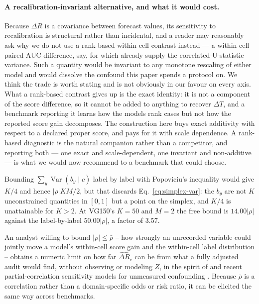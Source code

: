 \paragraph{A recalibration-invariant alternative, and what it would cost.}
Because $\Delta R$ is a covariance between forecast values, its sensitivity to
recalibration is structural rather than incidental, and a reader may reasonably ask why we
do not use a rank-based within-cell contrast instead --- a within-cell paired AUC
difference, say, for which \citet{delong1988comparing} already supply the
correlated-U-statistic variance. Such a quantity would be invariant to any monotone
rescaling of either model and would dissolve the confound this paper spends a protocol on.
We think the trade is worth stating and is not obviously in our favour on every axis.
What a rank-based contrast gives up is the exact identity: it is not a component of the
score difference, so it cannot be added to anything to recover $\Delta T$, and a benchmark
reporting it learns how the models rank cases but not how the reported score gain
decomposes. The construction here buys exact additivity with respect to a declared proper
score, and pays for it with scale dependence. A rank-based diagnostic is the natural
companion rather than a competitor, and reporting both --- one exact and scale-dependent,
one invariant and non-additive --- is what we would now recommend to a benchmark that
could choose.



Bounding $\sum_y\operatorname{Var}(b_y\mid c)$ label by label with Popoviciu's inequality
would give $K/4$ and hence $|\rho|KM/2$, but that discards Eq.~\eqref{eq:simplex-var}: the
$b_y$ are not $K$ unconstrained quantities in $[0,1]$ but a point on the simplex, and $K/4$
is unattainable for $K>2$. At VG150's $K=50$ and $M=2$ the free bound is $14.00|\rho|$
against the label-by-label $50.00|\rho|$, a factor of $3.57$.

An analyst willing to bound $|\rho|\le\bar\rho$ -- how strongly an unrecorded variable
could jointly move a model's within-cell score gain and the within-cell label
distribution -- obtains a numeric limit on how far $\widehat{\Delta R}_c$ can be from
what a fully adjusted audit would find, without observing or modeling $Z$, in the spirit
of \citet{rosenbaum2002observational} and recent partial-correlation sensitivity models
for unmeasured confounding \citep{cinelli2020making}.
Because $\bar\rho$ is a correlation rather than a domain-specific odds or risk ratio, it
can be elicited the same way across benchmarks.

